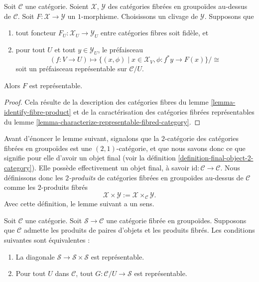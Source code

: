 \begin{lemma}
\label{lemma-criterion-representable-map-stack-in-groupoids}
Soit $\mathcal{C}$ une catégorie.
Soient $\mathcal{X}$, $\mathcal{Y}$ des catégories fibrées en groupoïdes
au-dessus de $\mathcal{C}$.
Soit $F : \mathcal{X} \to \mathcal{Y}$ un $1$-morphisme.
Choisissons un clivage de $\mathcal{Y}$.
Supposons que
\begin{enumerate}
\item tout foncteur $F_U : \mathcal{X}_U \longrightarrow \mathcal{Y}_U$
entre catégories fibres soit fidèle, et
\item pour tout $U$ et tout $y \in \mathcal{Y}_U$, le préfaisceau
$$
(f : V \to U)
\longmapsto
\{(x, \phi) \mid x \in \mathcal{X}_V, \phi : f^*y \to F(x)\}/\cong
$$
soit un préfaisceau représentable sur $\mathcal{C}/U$.
\end{enumerate}
Alors $F$ est représentable.
\end{lemma}

\begin{proof}
Cela résulte de la description des catégories fibres du
lemme \ref{lemma-identify-fibre-product} et de la caractérisation
des catégories fibrées représentables du
lemme \ref{lemma-characterize-representable-fibred-category}.
\end{proof}

\noindent
Avant d'énoncer le lemme suivant, signalons que la $2$-catégorie
des catégories fibrées en groupoïdes est une $(2, 1)$-catégorie, et que nous
savons donc ce que signifie pour elle d'avoir un objet final (voir la
définition \ref{definition-final-object-2-category}). Elle possède effectivement
un objet final, à savoir $\text{id} : \mathcal{C} \to \mathcal{C}$.
Nous définissons donc les {\it $2$-produits} de catégories fibrées en groupoïdes
au-dessus de $\mathcal{C}$ comme les $2$-produits fibrés
$$
\mathcal{X} \times \mathcal{Y} :=
\mathcal{X} \times_\mathcal{C} \mathcal{Y}.
$$
Avec cette définition, le lemme suivant a un sens.

\begin{lemma}
\label{lemma-representable-diagonal-groupoids}
Soit $\mathcal{C}$ une catégorie.
Soit $\mathcal{S} \to \mathcal{C}$ une catégorie fibrée en groupoïdes.
Supposons que $\mathcal{C}$ admette les produits de paires d'objets et les
produits fibrés.
Les conditions suivantes sont équivalentes :
\begin{enumerate}
\item La diagonale $\mathcal{S} \to \mathcal{S} \times \mathcal{S}$
est représentable.
\item Pour tout $U$ dans $\mathcal{C}$, tout
$G : \mathcal{C}/U \to \mathcal{S}$ est représentable.
\end{enumerate}
\end{lemma}

